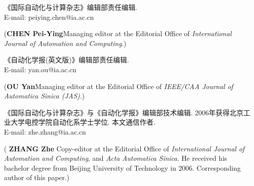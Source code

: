 \documentclass{aas}
\begin{document}
\begin{multicols}{2}
\begin{biographynophoto}
\quad 《国际自动化与计算杂志》编辑部责任编辑.\\E-mail: peiying.chen@ia.ac.cn

\noindent({\bf CHEN Pei-Ying}\quad Managing editor at the Editorial Office of
{\sl International Journal of Automation and Computing}.)
\end{biographynophoto}

\begin{biographynophoto}
\quad 《自动化学报(英文版)》编辑部责任编辑.\\E-mail: yan.ou@ia.ac.cn

\noindent({\bf OU Yan}\quad Managing editor at the Editorial Office of
{\sl IEEE/CAA Journal of Automatica Sinica (JAS)}.)
\end{biographynophoto}

\begin{biography}[zz.eps]
\quad
《国际自动化与计算杂志》与《自动化学报》编辑部技术编辑. 2006年获得北京工业大学电控学院自动化系学士学位.
本文通信作者.\\E-mail: zhe.zhang@ia.ac.cn

\noindent({\bf
ZHANG Zhe
}\quad
Copy-editor at the Editorial Office of
{\sl International Journal of Automation and Computing}, and {\sl
Acta Automatica Sinica}. He received his bachelor degree from Beijing
University of Technology in 2006. Corresponding author of this paper.)
\end{biography}
\end{multicols}
\end{document}
